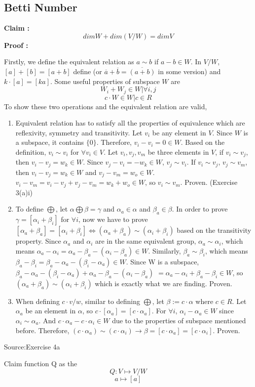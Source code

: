 \documentclass[12pt,letterpaper]{article}
\begin{document}
\begin{normalsize}
\subsection{Betti Number}
\large\textbf{Claim :} 
$$dim W + dim(V/W) = dim V$$
\newpage
\large\textbf{Proof :} 
\\[12pt]
\normalsize{
Firstly, we define the equivalent relation as $a \sim b$ if $a-b \in W $. In $V/W$,  $[a]+[b]=[a+b]$ define  (or $\overline{a} + \overline{b} = \overline{(a+b)}$ in some version) and $k \cdot [a] = [ka] $. Some useful properties of subspace $W$ are
$$W_i+W_j \in W|\forall i,j$$
$$c \cdot W \in W|c \in R$$
To show these two operations and the equivalent relation are valid,
\begin{indent} \begin{enumerate}
\item Equivalent relation has to satisfy all the properties of equivalence which are reflexivity, symmetry and transitivity. Let $v_i$ be any element in $V$. Since $W$ is a subspace, it contains $\{0\}$. Therefore, $v_i-v_i=0 \in W$. Based on the definition, $v_i \sim v_i$ for $\forall v_i \in V$. Let $v_i, v_j,v_m$ be three elements in $V$, if $v_i \sim v_j$, then $v_i-v_j=w_k \in W$. Since $v_j-v_i=-w_k \in W$, $v_j \sim v_i$. If $v_i \sim v_j$, $v_j \sim v_m$, then $v_i-v_j=w_k\in W$ and $v_j-v_m=w_o\in W$. $v_i-v_m=v_i-v_j+v_j-v_m=w_k+w_o \in W$, so $v_i \sim v_m$. Proven. (Exercise 3(a)i)
\item To define $\bigoplus$, let $\alpha \bigoplus \beta =\gamma$ and $\alpha_a \in \alpha$ and $\beta_a \in \beta$. In order to prove $\gamma=[\alpha_i + \beta_i]$ for $\forall i$, now we have to prove $[\alpha_a + \beta_a] = [\alpha_i + \beta_i] \Longleftrightarrow (\alpha_a + \beta_a) \sim (\alpha_i + \beta_i)$ based on the transitivity property. Since $\alpha_a$ and $\alpha_i$ are in the same equivalent group, $\alpha_a \sim \alpha_i$, which means $\alpha_a - \alpha_i=\alpha_a -\beta_a - (\alpha_i - \beta_a) \in W$. Similarly, $\beta_a \sim \beta_i$, which means $\beta_a - \beta_i=\beta_a -\alpha_a - (\beta_i - \alpha_a) \in W$. Since W is a subspace, $\beta_a -\alpha_a - (\beta_i - \alpha_a)+ \alpha_a -\beta_a- (\alpha_i - \beta_a)$ $= \alpha_a - \alpha_i+ \beta_a -\beta_i \in W$, so $(\alpha_a + \beta_a) \sim (\alpha_i + \beta_i)$ which is exactly what we are finding. Proven.
\item When defining $c \cdot v/w$, similar to defining $\bigoplus$, let $\beta:=c \cdot \alpha$ where $c \in R$. Let $\alpha_a$ be an element in $\alpha$,
so $c \cdot [\alpha_a]=[c \cdot \alpha_a]$. For $\forall i$, $\alpha_i-\alpha_a \in W$ since $\alpha_i \sim \alpha_a$. And $c \cdot \alpha_a -c \cdot \alpha_i \in W$ due to the properties of subspace mentioned before. Therefore, $(c \cdot \alpha_a) \sim (c \cdot \alpha_i) \longrightarrow \beta=[c \cdot \alpha_a] = [c \cdot \alpha_i]$. Proven.
\end{enumerate}
\end{indent}
\raggedleft\tiny{Source:Exercise 4a}
\\[15pt]
\raggedright
\normalsize{
Claim function Q as the $$Q : V \longmapsto V/W$$ $$a \longmapsto [a]$$

}}
\end{normalsize}
\end{document}
